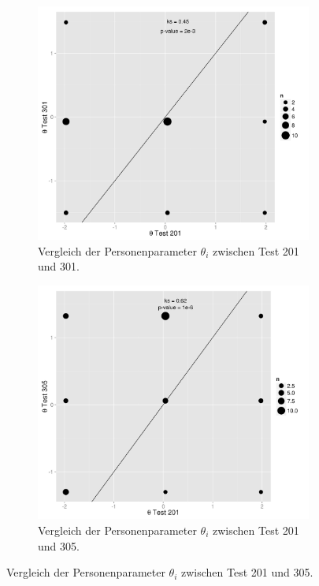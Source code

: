    
 \begin{figure}[htp]
 \centering
 \begin{subfigure}{0.49\textwidth}
   \includegraphics[width=1.0\linewidth]{graphics/GOF201301Pers.png}
   \caption{Vergleich der Personenparameter $\theta_i$ zwischen Test 201 und 301.}
   \label{fig:GOF201301P}
 \end{subfigure}
 \begin{subfigure}{0.49\textwidth}
   \includegraphics[width=1.0\linewidth]{graphics/GOF201305Pers.png}
   \caption{Vergleich der Personenparameter $\theta_i$ zwischen Test 201 und 305.}
   \label{fig:GOF201305P}
 \end{subfigure}


\end{figure}
